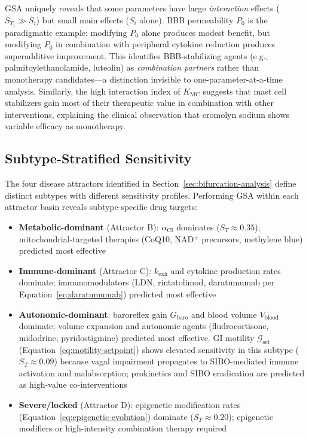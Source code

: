 \begin{modelunique}
GSA uniquely reveals that some parameters have large \emph{interaction} effects ($S_{T_i} \gg S_i$) but small main effects ($S_i$ alone). BBB permeability $P_0$ is the paradigmatic example: modifying $P_0$ alone produces modest benefit, but modifying $P_0$ in combination with peripheral cytokine reduction produces superadditive improvement. This identifies BBB-stabilizing agents (e.g., palmitoylethanolamide, luteolin) as \emph{combination partners} rather than monotherapy candidates---a distinction invisible to one-parameter-at-a-time analysis. Similarly, the high interaction index of $K_{\text{MC}}$ suggests that mast cell stabilizers gain most of their therapeutic value in combination with other interventions, explaining the clinical observation that cromolyn sodium shows variable efficacy as monotherapy.
\end{modelunique}

\subsection{Subtype-Stratified Sensitivity}

The four disease attractors identified in Section~\ref{sec:bifurcation-analysis} define distinct subtypes with different sensitivity profiles. Performing GSA within each attractor basin reveals subtype-specific drug targets:

\begin{itemize}
    \item \textbf{Metabolic-dominant} (Attractor B): $\alpha_{\text{CI}}$ dominates ($S_{T} \approx 0.35$); mitochondrial-targeted therapies (CoQ10, NAD$^+$ precursors, methylene blue) predicted most effective
    \item \textbf{Immune-dominant} (Attractor C): $k_{\text{exh}}$ and cytokine production rates dominate; immunomodulators (LDN, rintatolimod, daratumumab per Equation~\ref{eq:daratumumab}) predicted most effective
    \item \textbf{Autonomic-dominant}: baroreflex gain $G_{\text{baro}}$ and blood volume $V_{\text{blood}}$ dominate; volume expansion and autonomic agents (fludrocortisone, midodrine, pyridostigmine) predicted most effective. GI motility $\mathcal{G}_{\text{set}}$ (Equation~\ref{eq:motility-setpoint}) shows elevated sensitivity in this subtype ($S_T \approx 0.09$) because vagal impairment propagates to SIBO-mediated immune activation and malabsorption; prokinetics and SIBO eradication are predicted as high-value co-interventions
    \item \textbf{Severe/locked} (Attractor D): epigenetic modification rates (Equation~\ref{eq:epigenetic-evolution}) dominate ($S_{T} \approx 0.20$); epigenetic modifiers or high-intensity combination therapy required
\end{itemize}

